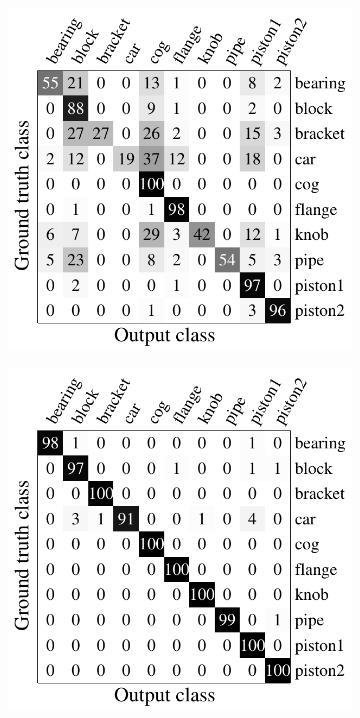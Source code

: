\begin{figure}[ht]
\begin{subfigure}[t]{0.32\linewidth}
	\end{subfigure}
	\begin{subfigure}[t]{0.32\linewidth}
		\label{fig/reg/confusion_intrinsic}
		\includegraphics[width=1\linewidth]{fig/reg/confusion_intrinsic.pdf}
	\end{subfigure}
	\begin{subfigure}[t]{0.32\linewidth}
		\label{fig/reg/confusion_minent}
		\includegraphics[width=1\linewidth]{fig/reg/confusion_minent.pdf}

\end{subfigure}
\end{figure}
